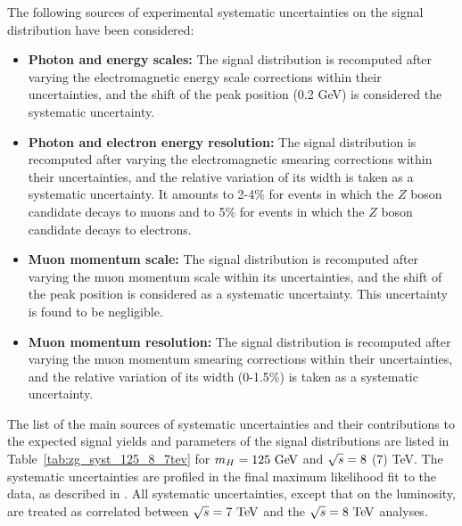 The following sources of experimental systematic uncertainties on the signal \dm
distribution have been considered:
\begin{itemize}
\item \textbf{Photon and energy scales:}
The signal \dm distribution is recomputed after varying the electromagnetic
energy scale corrections within their uncertainties, and the shift of the
peak position (0.2 GeV) is considered the systematic uncertainty.
%
\item \textbf{Photon and electron energy resolution:}
The signal \dm distribution is recomputed after varying the electromagnetic
smearing corrections within their uncertainties, and the relative variation of
its width is taken as a systematic uncertainty. It amounts to 2-4\% for events
in which the $Z$ boson candidate decays to muons and to 5\% for events in which the 
$Z$ boson candidate decays to electrons.
%
\item \textbf{Muon momentum scale:}
The signal \dm distribution is recomputed after varying the muon momentum scale
within its uncertainties, and the shift of the peak position is considered
as a systematic uncertainty. This uncertainty is found to be negligible.
%
\item \textbf{Muon momentum resolution:}
The signal \dm distribution is recomputed after varying the muon momentum smearing
corrections within their uncertainties, and the relative variation of its
width (0-1.5\%) is taken as a systematic uncertainty.
\end{itemize}

The list of the main sources of systematic uncertainties and their contributions
to the \HToZg expected signal yields and parameters of the signal \dm distributions
are listed in Table~\ref{tab:zg_syst_125_8_7tev} for $m_H = 125 \GeV$ and
$\sqrt{s} = 8$ (7) TeV. The systematic uncertainties are profiled in the final
maximum likelihood fit to the data, as described in . All
systematic uncertainties, except that on the luminosity, are treated as
correlated between $\rts = 7 \TeV$ and the $\rts = 8 \TeV$ analyses.

